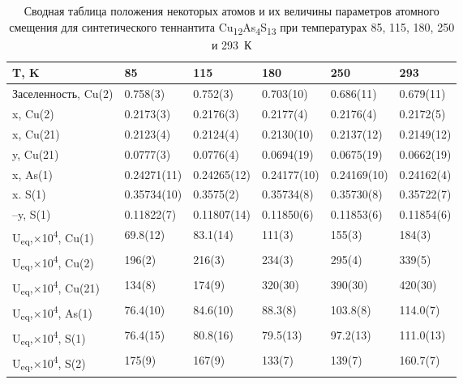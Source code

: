 \begin{landscape}
\begin{table} [htbp]
\centering
\caption{Сводная таблица положения некоторых атомов и их величины параметров атомного смещения для синтетического теннантита Cu\textsubscript{12}As\textsubscript{4}S\textsubscript{13} при температурах 85, 115, 180, 250 и 293~К}%
	\label{xray2}%
    \renewcommand{\arraystretch}{1.5}
	\begin{tabular}{@{}@{\extracolsep{20pt}}llllll@{}} 
 \toprule     %
T, K             	          & 85 	         & 115  	       & 180    	     & 250    	     & 293         \\ 
   \midrule  
Заселенность, Cu(2) & 0.758(3)    & 0.752(3)    	 & 0.703(10)     & 0.686(11)    & 0.679(11)    \\
x, Cu(2)         		 & 0.2173(3)   & 0.2176(3)   	 & 0.2177(4)   	& 0.2176(4)   & 0.2172(5) \\
x, Cu(21)        		 & 0.2123(4)   & 0.2124(4)   	 & 0.2130(10)   & 0.2137(12)   & 0.2149(12)   \\
y, Cu(21)       		 & 0.0777(3)   & 0.0776(4)   	 & 0.0694(19)   & 0.0675(19)   & 0.0662(19)   \\
x, As(1)         		& 0.24271(11)  & 0.24265(12)  	 & 0.24177(10)  & 0.24169(10)  & 0.24162(4)  \\
x. S(1)          		& 0.35734(10) & 0.3575(2) 	 & 0.35734(8)  & 0.35730(8)  & 0.35722(7)  \\
–y, S(1)         		 & 0.11822(7) & 0.11807(14)	 & 0.11850(6) 	& 0.11853(6) & 0.11854(6) \\
U\textsubscript{eq},$ \times$10\textsuperscript{4}, Cu(1)   & 69.8(12)       & 83.1(14)       & 111(3)      	    & 155(3)       & 184(3)      \\
U\textsubscript{eq},$ \times$10\textsuperscript{4}, Cu(2)   & 196(2)   	& 216(3)          & 234(3)         & 295(4)       & 339(5)      \\
U\textsubscript{eq},$ \times$10\textsuperscript{4}, Cu(21)  & 134(8)      	& 174(9)          & 320(30)       & 390(30)     & 420(30)     \\
U\textsubscript{eq},$ \times$10\textsuperscript{4}, As(1)   & 76.4(10)     	& 84.6(10)      & 88.3(8)         & 103.8(8)    & 114.0(7)    \\
U\textsubscript{eq},$ \times$10\textsuperscript{4}, S(1)    & 76.4(15)    	& 80.8(16)      & 79.5(13)        & 97.2(13)    & 111.0(13)   \\
U\textsubscript{eq},$ \times$10\textsuperscript{4}, S(2)    & 175(9)      	& 167(9)         & 133(7)  	     & 139(7)       & 160.7(7)  \\ \hline
 \bottomrule 
\end{tabular}
\end{table}
\end{landscape}

